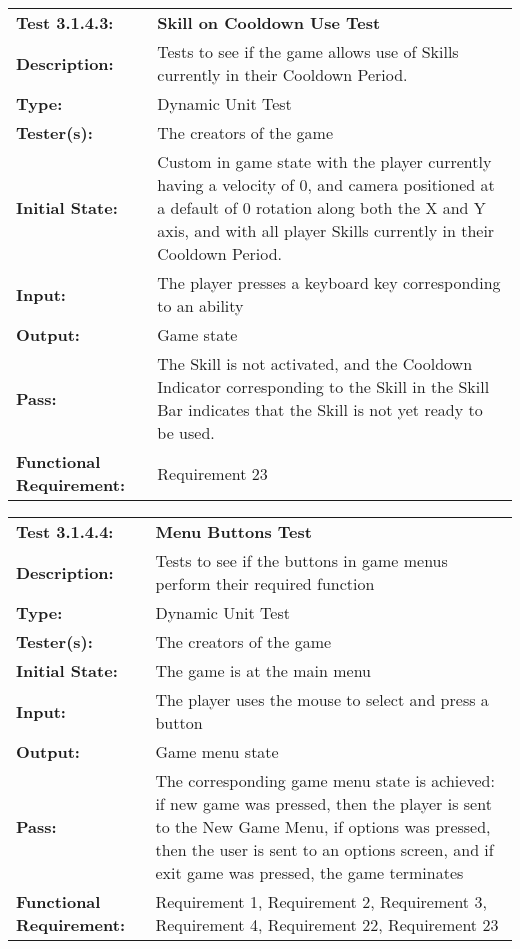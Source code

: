 \documentclass[12pt, titlepage]{article}
\begin{document}
\begin{mdframed}[linewidth=1pt]
\begin{tabularx}{\textwidth}{@{}p{3cm}X@{}}
{\bf Test 3.1.4.3:} & {\bf Skill on Cooldown Use Test}\\[\baselineskip]
{\bf Description:} & Tests to see if the game allows use of Skills currently in their Cooldown Period. \\[0.5\baselineskip]
{\bf Type:} & Dynamic Unit Test\\[0.5\baselineskip]
{\bf Tester(s):} & The creators of the game\\[0.5\baselineskip]
{\bf Initial State:} & Custom in game state with the player currently having a velocity of 0, and camera positioned at a default of 0 rotation along both the X and Y axis, and with all player Skills currently in their Cooldown Period.\\[0.5\baselineskip]
{\bf Input:} & The player presses a keyboard key corresponding to an ability \\[0.5\baselineskip]
{\bf Output:} & Game state\\[0.5\baselineskip]
{\bf Pass:} & The Skill is not activated, and  the Cooldown Indicator corresponding to the Skill in the Skill Bar indicates that the Skill is not yet ready to be used. \\[0.5\baselineskip]
{\bf Functional Requirement:} & Requirement 23
\end{tabularx}
\end{mdframed}

\begin{mdframed}[linewidth=1pt]
\begin{tabularx}{\textwidth}{@{}p{3cm}X@{}}
{\bf Test 3.1.4.4:} & {\bf Menu Buttons Test}\\[\baselineskip]
{\bf Description:} & Tests to see if the buttons in game menus perform their required function\\[0.5\baselineskip]
{\bf Type:} & Dynamic Unit Test\\[0.5\baselineskip]
{\bf Tester(s):} & The creators of the game\\[0.5\baselineskip]
{\bf Initial State:} & The game is at the main menu\\[0.5\baselineskip]
{\bf Input:} & The player uses the mouse to select and press a button \\[0.5\baselineskip]
{\bf Output:} & Game menu state\\[0.5\baselineskip]
{\bf Pass:} & The corresponding game menu state is achieved: if new game was pressed, then the player is sent to the New Game Menu, if options was pressed, then the user is sent to an options screen, and if exit game was pressed, the game terminates \\[0.5\baselineskip]
{\bf Functional Requirement:} & Requirement 1, Requirement 2, Requirement 3, Requirement 4, Requirement 22, Requirement 23
\end{tabularx}
\end{mdframed}
\end{document}
